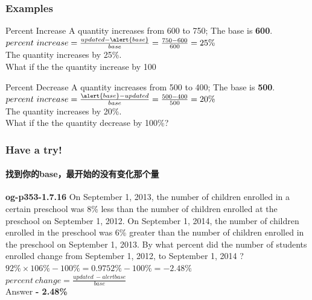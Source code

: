 \documentclass[
	11pt, %
]{beamer}
\begin{document}
\begin{frame}
	\frametitle{Examples}
	

	
	\begin{exampleblock}{Percent Increase}
		A quantity increases from 600 to 750; The base is \pause \textbf{\alert{600}}.\\
		$percent\ increase = \frac{updated- \alert{base}}{base}  = \frac{750 - 600}{600} = 25\% $\\
		The quantity increases by 25\%. \\ \pause What if the the quantity increase by 100%
	\end{exampleblock}

	\bigskip %

		\begin{exampleblock}{Percent Decrease}
		A quantity increases from 500 to 400; The base is \pause \textbf{\alert{500}}.\\
		$percent\ increase = \frac{\alert{base} - updated}{base}  = \frac{500 - 400}{500} = 20\% $\\
		The quantity increases by 20\%. \\ \pause What if the the quantity decrease by 100\%?
	\end{exampleblock}
\end{frame}


\begin{frame}
	\frametitle{Have a try!}
	\framesubtitle{找到你的base，最开始的没有变化那个量}
	\textbf{og-p353-1.7.16}
On September 1, 2013, the number of children enrolled in
a certain preschool was 8\% less than the number of children enrolled at the
preschool on September 1, 2012. On September 1, 2014, the number of
children enrolled in the preschool was 6\% greater than the number of
children enrolled in the preschool on September 1, 2013. By what percent
did the number of students enrolled change from September 1, 2012, to
September 1, 2014 ? \\
\bigskip
\pause
$92\% \times 106\% - 100\% = 0.9752\% - 100\% = - 2.48\% $\\
$percent\ change = \frac{updated\ - alert{base} }{base} $\\
\bigskip
Answer \textbf{- 2.48\%}
\end{frame}

\end{document}
